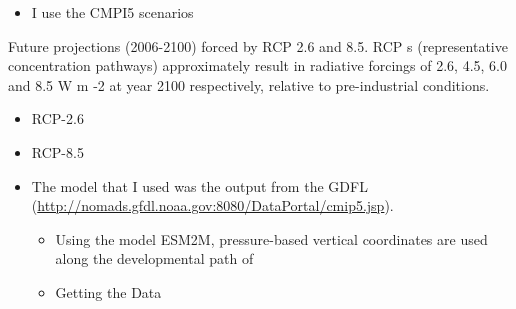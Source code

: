 \documentclass[11pt]{article}
\begin{document}
\begin{itemize}
\item I use the CMPI5 scenarios
\end{itemize}
Future   projections   (2006-2100) forced by RCP 2.6 and 8.5. RCP
s (representative concentration pathways) approximately result in radiative forcings of 2.6, 4.5, 6.0 and 8.5 W m
-2 at  year 2100 respectively, relative to pre-industrial conditions.
\begin{itemize}
\item RCP-2.6
\item RCP-8.5
\item The model that I used was the output from the GDFL (\href{http://nomads.gfdl.noaa.gov:8080/DataPortal/cmip5.jsp}{http://nomads.gfdl.noaa.gov:8080/DataPortal/cmip5.jsp}).
\begin{itemize}
\item Using the model
       ESM2M, pressure-based vertical coordinates are used along the developmental path of
\item Getting the Data


\end{itemize}
\end{itemize}
\end{document}
